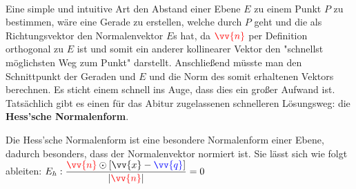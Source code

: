 \documentclass[main.tex]{subfiles}
\begin{document}
        \paragraph{} Eine simple und intuitive Art den Abstand einer Ebene $E$ zu einem Punkt $P$ zu bestimmen, wäre eine Gerade
        zu erstellen, welche durch $P$ geht und die als Richtungsvektor den Normalenvektor $E$s hat, da $\textcolor{red}{\vv{n}}$
        per Definition orthogonal zu $E$ ist und somit ein anderer kollinearer Vektor den "schnellst möglichsten Weg zum Punkt"
        darstellt. Anschließend müsste man den Schnittpunkt der Geraden und $E$ und die Norm des somit erhaltenen Vektors berechnen.
        Es sticht einem schnell ins Auge, dass dies ein großer Aufwand ist. Tatsächlich gibt es einen für das Abitur zugelassenen
        schnelleren Lösungsweg: die \textbf{Hess'sche Normalenform}.
        \\
        \begin{Definition}
            Die Hess'sche Normalenform ist eine besondere Normalenform einer Ebene, dadurch besonders, dass der Normalenvektor
            normiert ist. Sie lässt sich wie folgt ableiten:
            $E_h: \dfrac{\textcolor{red}{\vv{n}} \odot [\vv{x} - \textcolor{blue}{\vv{q}}]}{|\textcolor{red}{\vv{n}}|} = 0$
        \end{Definition}
        \\
        \\
\end{document}
